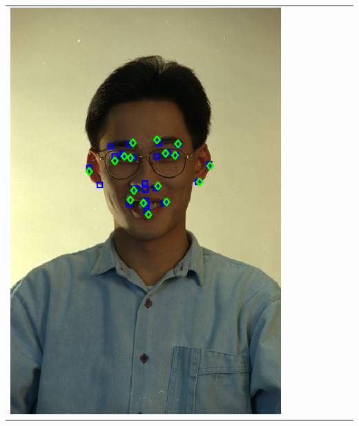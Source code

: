 \documentclass[portrait,final,a0paper,fontscale=0.277]{baposter}
\begin{document}
\begin{poster}
{{\begin{tabular}{@{}rccccccc@{}}
\parbox[c]{0.11\linewidth}{\includegraphics[width=\linewidth]{images/l_fb_success_1.pdf}} &

\end{tabular}}}
\end{poster}
\end{document}

